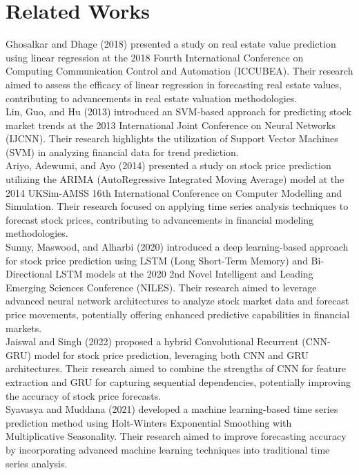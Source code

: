\documentclass{ieeeojies}
\begin{document}
\section{Related Works}
Ghosalkar and Dhage (2018) \cite{b1} presented a study on real estate value prediction using linear regression at the 2018 Fourth International Conference on Computing Communication Control and Automation (ICCUBEA). Their research aimed to assess the efficacy of linear regression in forecasting real estate values, contributing to advancements in real estate valuation methodologies. \\
Lin, Guo, and Hu (2013) \cite{b2} introduced an SVM-based approach for predicting stock market trends at the 2013 International Joint Conference on Neural Networks (IJCNN). Their research highlights the utilization of Support Vector Machines (SVM) in analyzing financial data for trend prediction. \\
Ariyo, Adewumi, and Ayo (2014) \cite{b3} presented a study on stock price prediction utilizing the ARIMA (AutoRegressive Integrated Moving Average) model at the 2014 UKSim-AMSS 16th International Conference on Computer Modelling and Simulation. Their research focused on applying time series analysis techniques to forecast stock prices, contributing to advancements in financial modeling methodologies. \\
Sunny, Maswood, and Alharbi (2020) \cite{b4} introduced a deep learning-based approach for stock price prediction using LSTM (Long Short-Term Memory) and Bi-Directional LSTM models at the 2020 2nd Novel Intelligent and Leading Emerging Sciences Conference (NILES). Their research aimed to leverage advanced neural network architectures to analyze stock market data and forecast price movements, potentially offering enhanced predictive capabilities in financial markets. \\
Jaiswal and Singh (2022) \cite{b5} proposed a hybrid Convolutional Recurrent (CNN-GRU) model for stock price prediction, leveraging both CNN and GRU architectures. Their research aimed to combine the strengths of CNN for feature extraction and GRU for capturing sequential dependencies, potentially improving the accuracy of stock price forecasts. \\
Syavasya and Muddana (2021) \cite{b6} developed a machine learning-based time series prediction method using Holt-Winters Exponential Smoothing with Multiplicative Seasonality. Their research aimed to improve forecasting accuracy by incorporating advanced machine learning techniques into traditional time series analysis. 
\end{document}
